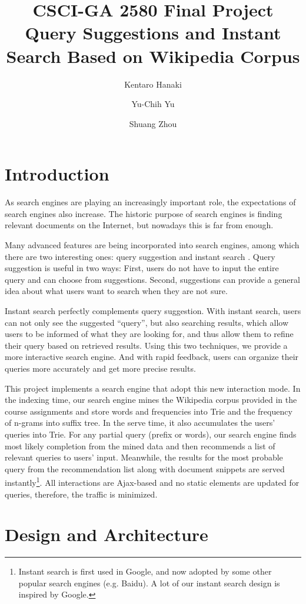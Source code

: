 \documentclass{article}
\title{CSCI-GA 2580 Final Project\\
Query Suggestions and Instant Search Based on Wikipedia Corpus}
\author{Kentaro Hanaki \and Yu-Chih Yu \and Shuang Zhou}
\begin{document}
\maketitle

\section{Introduction}
As search engines are playing an increasingly important role, the expectations of search engines also increase. The historic purpose of search engines is finding relevant documents on the Internet, but nowadays this is far from enough.

Many advanced features are being incorporated into search engines, among which there are two interesting ones: query suggestion and instant search \cite{sigir}. Query suggestion is useful in two ways: First, users do not have to input the entire query and can choose from suggestions. Second, suggestions can provide a general idea about what users want to search when they are not sure.

Instant search perfectly complements query suggestion. With instant search, users can not only see the suggested ``query'', but also searching results, which allow users to be informed of what they are looking for, and thus allow them to refine their query based on retrieved results. Using this two techniques, we provide a more interactive search engine. And with rapid feedback, users can organize their queries more accurately and get more precise results.

This project implements a search engine that adopt this new interaction mode. In the indexing time, our search engine mines the Wikipedia corpus provided in the course assignments and store words and frequencies into Trie and the frequency of n-grams into suffix tree. In the serve time, it also accumulates the users' queries into Trie. For any partial query (prefix or words), our search engine finds most likely completion from the mined data and then recommends a list of relevant queries to users' input.
Meanwhile, the results for the most probable query from the recommendation list along with document snippets are served instantly\footnote{Instant search is first used in Google, and now adopted by some other popular search engines (e.g. Baidu). A lot of our instant search design is inspired by Google.}. All interactions are Ajax-based and no static elements are updated for queries, therefore, the traffic is minimized.

\section{Design and Architecture}
\end{document}
